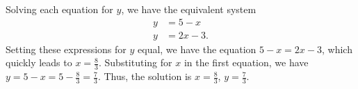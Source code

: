 Solving each equation for $y$, we have the equivalent system
\begin{align*}
y &= 5 - x\\
y &= 2x - 3.
\end{align*}
Setting these expressions for $y$ equal, we  have the equation 
$5 - x = 2x - 3$, which quickly leads to
 $x = \frac{8}{3}$.  Substituting for $x$ in the first equation, we have $y = 5 - x = 5 - \frac{8}{3} = \frac{7}{3}$.
Thus, the solution is $x = \frac{8}{3}$, $y = \frac{7}{3}$.